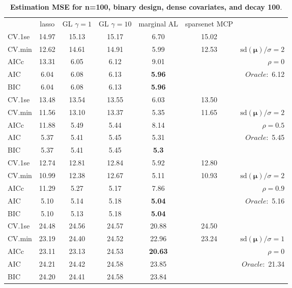 \begin{table}\vspace{-.5cm}
\caption[l]{ { \bf Estimation MSE for n=100, binary design, 
dense covariates, and  decay  100}.}
\vspace{-.5cm}
\footnotesize{}
\begin{center}
\begin{tabular}{l*{5}{c}|r}
& lasso & GL $\gamma=1$ & GL $\gamma=10$ & marginal AL & sparsenet MCP  & \\
 \cline{1-7}
CV.1se & 14.97 & 15.13 & 15.17 & 6.70 & 15.02 & \\
CV.min & 12.62 & 14.61 & 14.91 & 5.99 & 12.53 &  $\mathrm{sd}(\mathbf{\mu})/\sigma=2$ \\
AICc & 13.31 & 6.05 & 6.12 & 9.01 & & $\rho=0$ \\
AIC & 6.04 & 6.08 & 6.13 & {\bf 5.96} & &  \multirow{2}{*}{$Oracle: $ 6.12} \\
BIC & 6.04 & 6.08 & 6.13 & {\bf 5.96} & &  \\
 \hline 
CV.1se & 13.48 & 13.54 & 13.55 & 6.03 & 13.50 & \\
CV.min & 11.56 & 13.10 & 13.37 & 5.35 & 11.65 &  $\mathrm{sd}(\mathbf{\mu})/\sigma=2$ \\
AICc & 11.88 & 5.49 & 5.44 & 8.14 & & $\rho=0.5$ \\
AIC & 5.37 & 5.41 & 5.45 & 5.31 & &  \multirow{2}{*}{$Oracle: $ 5.45} \\
BIC & 5.37 & 5.41 & 5.45 & {\bf 5.3} & &  \\
 \hline 
CV.1se & 12.74 & 12.81 & 12.84 & 5.92 & 12.80 & \\
CV.min & 10.99 & 12.38 & 12.67 & 5.11 & 10.93 &  $\mathrm{sd}(\mathbf{\mu})/\sigma=2$ \\
AICc & 11.29 & 5.27 & 5.17 & 7.86 & & $\rho=0.9$ \\
AIC & 5.10 & 5.14 & 5.18 & {\bf 5.04} & &  \multirow{2}{*}{$Oracle: $ 5.16} \\
BIC & 5.10 & 5.13 & 5.18 & {\bf 5.04} & &  \\
 \hline 
CV.1se & 24.48 & 24.56 & 24.57 & 20.88 & 24.50 & \\
CV.min & 23.19 & 24.40 & 24.52 & 22.96 & 23.24 &  $\mathrm{sd}(\mathbf{\mu})/\sigma=1$ \\
AICc & 23.11 & 23.13 & 24.53 & {\bf 20.63} & & $\rho=0$ \\
AIC & 24.21 & 24.42 & 24.58 & 23.85 & &  \multirow{2}{*}{$Oracle: $ 21.34} \\
BIC & 24.20 & 24.41 & 24.58 & 23.84 & &  \\

\end{tabular}
\end{center}
\end{table}

